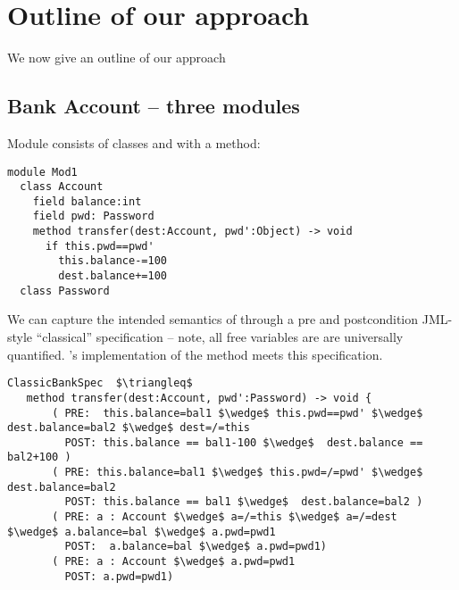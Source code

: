 

\section{Outline of our approach}
\label{s:outline}
We now give an outline of our approach %


 \subsection{Bank Account -- three modules}
\label{s:bank}
  
Module    consists   of classes   and  
with a  method:
%
%
%
%
% 
\begin{lstlisting}[language=Chainmail, frame=lines]
module Mod1
  class Account
    field balance:int 
    field pwd: Password
    method transfer(dest:Account, pwd':Object) -> void
      if this.pwd==pwd'
        this.balance-=100
        dest.balance+=100
  class Password
\end{lstlisting}
%
\noindent 
We can capture the intended
semantics of %
through  a pre and postcondition 
JML-style\cite{Leavens-etal07}  ``classical''
specification
-- note, all free variables are are universally quantified.
's implementation of the  method meets
this specification.



\begin{lstlisting}[mathescape=true, frame=lines, language=Chainmail]
ClassicBankSpec  $\triangleq$
   method transfer(dest:Account, pwd':Password) -> void {
       ( PRE:  this.balance=bal1 $\wedge$ this.pwd==pwd' $\wedge$ dest.balance=bal2 $\wedge$ dest=/=this 
         POST: this.balance == bal1-100 $\wedge$  dest.balance == bal2+100 )
       ( PRE: this.balance=bal1 $\wedge$ this.pwd=/=pwd' $\wedge$ dest.balance=bal2
         POST: this.balance == bal1 $\wedge$  dest.balance=bal2 )
       ( PRE: a : Account $\wedge$ a=/=this $\wedge$ a=/=dest  $\wedge$ a.balance=bal $\wedge$ a.pwd=pwd1
         POST:  a.balance=bal $\wedge$ a.pwd=pwd1)
       ( PRE: a : Account $\wedge$ a.pwd=pwd1  
         POST: a.pwd=pwd1)       
\end{lstlisting}
 
